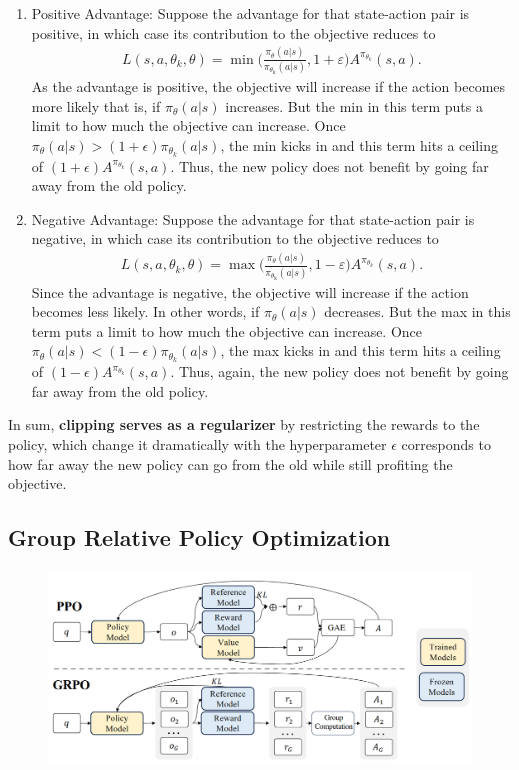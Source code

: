 \begin{enumerate}
	\item Positive Advantage: Suppose the advantage for that state-action pair is positive, in which case its contribution to the objective reduces to
\begin{align}
	L(s, a, \theta_k, \theta) = \min \Bigg(\frac{\pi_{\theta}\left(a | s\right)}{\pi_{\theta_{\text {k}}}\left(a | s\right)}, 1+\varepsilon \Bigg) A^{\pi_{\theta_k}}(s,a).
	\label{eq:ppo_positive}
\end{align}
As the advantage is positive, the objective will increase if the action becomes more likely that is, if $\pi_{\theta}(a|s)$ increases. But the min in this term puts a limit to how much the objective can increase. Once $\pi_{\theta}(a|s) > (1+\epsilon) \pi_{\theta_k}(a|s)$, the min kicks in and this term hits a ceiling of $(1+\epsilon) A^{\pi_{\theta_k}}(s,a)$. Thus, the new policy does not benefit by going far away from the old policy.
\item Negative Advantage: Suppose the advantage for that state-action pair is negative, in which case its contribution to the objective reduces to
\begin{align}
	L(s, a, \theta_k, \theta) = \max \Bigg(\frac{\pi_{\theta}\left(a | s\right)}{\pi_{\theta_{\text {k}}}\left(a | s\right)}, 1-\varepsilon \Bigg) A^{\pi_{\theta_k}}(s,a).
	\label{eq:ppo_negative}
\end{align}
Since the advantage is negative, the objective will increase if the action becomes less likely. In other words, if $\pi_{\theta}(a|s)$ decreases. But the max in this term puts a limit to how much the objective can increase. Once $\pi_{\theta}(a|s) < (1-\epsilon) \pi_{\theta_k}(a|s)$, the max kicks in and this term hits a ceiling of $(1-\epsilon) A^{\pi_{\theta_k}}(s,a)$. Thus, again, the new policy does not benefit by going far away from the old policy.
\end{enumerate}
In sum, \textbf{clipping serves as a regularizer} by restricting the rewards to the policy, which change it dramatically with the hyperparameter $\epsilon$ corresponds to how far away the new policy can go from the old while still profiting the objective.

\subsection{Group Relative Policy Optimization}

\begin{figure}[t]
	\centering
	\includegraphics[scale=0.5]{./images/transformer/grpo.png}
\end{figure}

